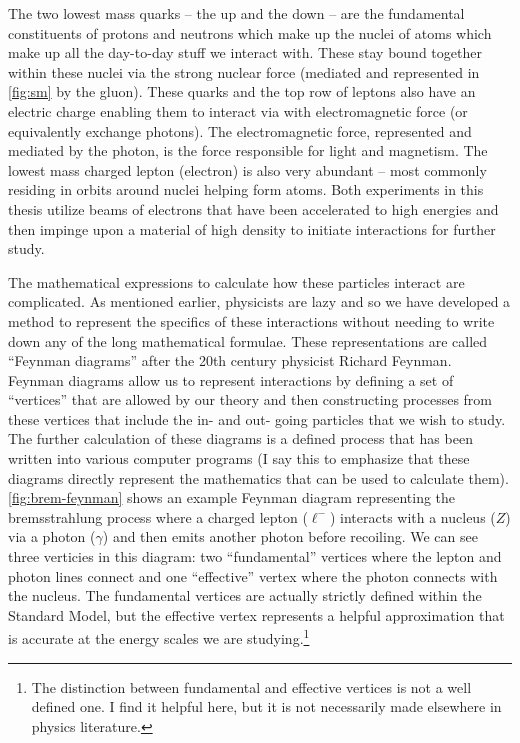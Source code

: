 The two lowest mass quarks -- the up and the down -- are the fundamental constituents of protons
and neutrons which make up the nuclei of atoms which make up all the day-to-day stuff we interact
with. These stay bound together within these nuclei via the strong nuclear force (mediated and
represented in \cref{fig:sm} by the gluon). These quarks and the top row of leptons also have an
electric charge enabling them to interact via with electromagnetic force (or equivalently exchange
photons). The electromagnetic force, represented and mediated by the photon, is the force
responsible for light and magnetism. The lowest mass charged lepton (electron) is also very
abundant -- most commonly residing in orbits around nuclei helping form atoms. Both experiments in
this thesis utilize beams of electrons that have been accelerated to high energies and then
impinge upon a material of high density to initiate interactions for further study.

The mathematical expressions to calculate how these particles interact are complicated. As
mentioned earlier, physicists are lazy and so we have developed a method to represent the specifics
of these interactions without needing to write down any of the long mathematical formulae. These
representations are called ``Feynman diagrams'' after the 20th century physicist Richard Feynman.
Feynman diagrams allow us to represent interactions by defining a set of ``vertices'' that are
allowed by our theory and then constructing processes from these vertices that include the in- and
out- going particles that we wish to study. The further calculation of these diagrams is a defined
process that has been written into various computer programs (I say this to emphasize that these
diagrams directly represent the mathematics that can be used to calculate them).
\cref{fig:brem-feynman} shows an example Feynman diagram representing the bremsstrahlung process
where a charged lepton (\(\ell^-\)) interacts with a nucleus (\(Z\)) via a photon (\(\gamma\)) and
then emits another photon before recoiling. We can see three verticies in this diagram: two
``fundamental'' vertices where the lepton and photon lines connect and one ``effective'' vertex
where the photon connects with the nucleus. The fundamental vertices are actually strictly defined
within the Standard Model, but the effective vertex represents a helpful approximation that is
accurate at the energy scales we are studying.\footnote{ The distinction between fundamental and
	effective vertices is not a well defined one. I find it helpful here, but it is not necessarily
	made elsewhere in physics literature. }

